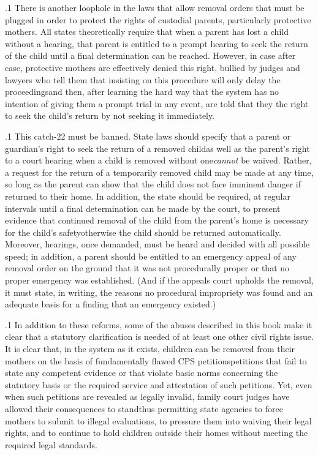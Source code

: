 \documentclass[11pt, twoside]{article}
\begin{document}
{\p.1{%
There is another loophole in the laws that allow  removal
orders that must be plugged in order to protect the rights of custodial
parents, particularly protective mothers. All states theoretically require
that when a parent has lost a child without a hearing, that parent is
entitled to a prompt hearing to seek the return of the child until a
final determination can be reached. However, in case after case, protective mothers are effectively denied this right, bullied by judges and
lawyers who tell them that insisting on this procedure will only delay
the proceedings\mdash{}and then, after learning the hard way that the system
has no intention of giving them a prompt trial in any event, are told
that they  the right to seek the child’s return by not seeking it
immediately.
}%

\p.1{%
This catch-22 must be banned. State laws should specify that a parent or guardian’s right to seek the return of a  removed
child\mdash{}as well as the parent’s right to a court hearing when a child is
removed without one\mdash{}\textit{cannot} be waived. Rather, a request for the return of a temporarily removed child may be made at any time, so long
as the parent can show that the child does not face imminent danger if
returned to their home. In addition, the state should be required, at regular intervals until a final determination can be made by the court, to
present evidence that continued removal of the child from the parent’s
home is necessary for the child’s safety\mdash{}otherwise the child should be
returned automatically. Moreover,  hearings, once demanded,
must be heard and decided with all possible speed; in addition, a parent
should be entitled to an emergency appeal of any removal order on the
ground that it was not procedurally proper or that no proper emergency
was established. (And if the appeals court upholds the removal, it must
state, in writing, the reasons no procedural impropriety was found and
an adequate basis for a finding that an emergency existed.)
}%

\p.1{%
In addition to these reforms, some of the abuses described in this
book make it clear that a statutory clarification is needed of at least one
other civil rights issue. It is clear that, in the system as it exists, children
can be removed from their mothers on the basis of fundamentally flawed
CPS petitions\mdash{}petitions that fail to state any competent evidence or
that violate basic norms concerning the statutory basis or the required
service and attestation of such petitions. Yet, even when such petitions
are revealed as legally invalid, family court judges have allowed their
consequences to stand\mdash{}thus permitting state agencies to force mothers
to submit to illegal evaluations, to pressure them into waiving their legal
rights, and to continue to hold children outside their homes without
meeting the required legal standards.
}%

}
\end{document}
